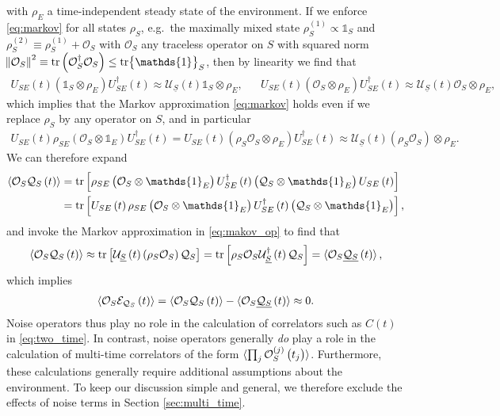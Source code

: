 \documentclass[aps,pra,twocolumn,longbibliography]{revtex4-2}
\newcommand{\p}[1]{\left( #1 \right)} %
\renewcommand{\sp}[1]{\left[ #1 \right]} %
\newcommand{\bk}{\braket} %
\newcommand{\ul}{\underline} %
\newcommand{\E}{\mathcal{E}}
\renewcommand{\O}{\mathcal{O}}
\newcommand{\Q}{\mathcal{Q}}
\newcommand{\U}{\mathcal{U}}
\newcommand{\1}{\mathds{1}}
\begin{document}
with $\rho_E$ a time-independent steady state of the environment.  If
we enforce \eqref{eq:markov} for all states $\rho_S$, e.g.~the
maximally mixed state $\rho_S^{(1)}\propto\1_S$ and
$\rho_S^{(2)}\equiv\rho_S^{(1)}+\O_S$ with $\O_S$ any traceless
operator on $S$ with squared norm
$\norm{\O_S}^2\equiv\tr\p{\O_S^\dag\O_S}\le\tr\1_S$, then by linearity
we find that
\begin{align}
  U_{SE}\p{t} \p{\1_S\otimes\rho_E} U_{SE}^\dag\p{t}
  \approx \U_{\ul S}\p{t} \1_S\otimes\rho_E,
  &&
  U_{SE}\p{t} \p{\O_S\otimes\rho_E} U_{SE}^\dag\p{t}
  \approx \U_{\ul S}\p{t} \O_S\otimes\rho_E,
\end{align}
which implies that the Markov approximation \eqref{eq:markov} holds
even if we replace $\rho_S$ by any operator on $S$, and in particular
\begin{align}
  U_{SE}\p{t} \rho_{SE} \p{\O_S\otimes\1_E} U_{SE}^\dag\p{t}
  = U_{SE}\p{t} \p{\rho_S\O_S\otimes\rho_E} U_{SE}^\dag\p{t}
  \approx \U_{\ul S}\p{t}\p{\rho_S\O_S}\otimes\rho_E.
  \label{eq:makov_op}
\end{align}
We can therefore expand
\begin{align}
  \bk{\O_S\Q_S\p{t}}
  &= \tr\sp{\rho_{SE} \p{\O_S\otimes\1_E}
    U_{SE}^\dag\p{t} \p{\Q_S\otimes\1_E} U_{SE}\p{t}} \\
  &= \tr\sp{U_{SE}\p{t} \rho_{SE} \p{\O_S\otimes\1_E}
    U_{SE}^\dag\p{t} \p{\Q_S\otimes\1_E}},
\end{align}
and invoke the Markov approximation in \eqref{eq:makov_op} to find
that
\begin{align}
  \bk{\O_S\Q_S\p{t}}
  \approx \tr\sp{\U_{\ul S}\p{t}\p{\rho_S\O_S} \Q_S}
  = \tr\sp{\rho_S \O_S \U_{\ul S}^\dag\p{t} \Q_S}
  = \bk{\O_S\ul{\Q_S}\p{t}},
\end{align}
which implies
\begin{align}
  \bk{\O_S\E_{\Q_S}\p{t}}
  = \bk{\O_S\Q_S\p{t}} - \bk{\O_S\ul{\Q_S}\p{t}}
  \approx 0.
\end{align}
Noise operators thus play no role in the calculation of correlators
such as $C\p{t}$ in \eqref{eq:two_time}.  In contrast, noise operators
generally {\it do} play a role in the calculation of multi-time
correlators of the form
$\bk{\prod_j\O_S^{(j)}\p{t_j}}$\cite{blocher2019quantum}.
Furthermore, these calculations generally require additional
assumptions about the environment.  To keep our discussion simple and
general, we therefore exclude the effects of noise terms in Section
\ref{sec:multi_time}.

\end{document}
